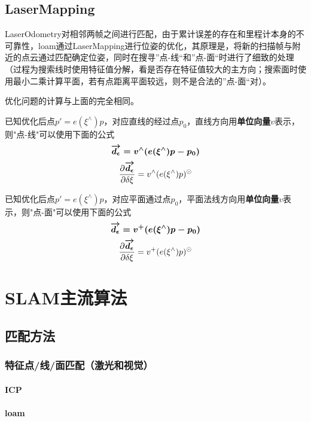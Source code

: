 \documentclass{ctexart}
\begin{document}
	\subsection{LaserMapping}
	LaserOdometry对相邻两帧之间进行匹配，由于累计误差的存在和里程计本身的不可靠性，loam通过LaserMapping进行位姿的优化，其原理是，将新的扫描帧与附近的点云通过匹配确定位姿，同时在搜寻”点-线“和”点-面“时进行了细致的处理（过程为搜索线时使用特征值分解，看是否存在特征值较大的主方向；搜索面时使用最小二乘计算平面，若有点距离平面较远，则不是合法的”点-面“对）。
	\par 优化问题的计算与上面的完全相同。
	\par 已知优化后点$p'=e(\xi ^\wedge)p$，对应直线的经过点$p_0$，直线方向用\textbf{单位向量}$v$表示，则"点-线"可以使用下面的公式
	\begin{equation}
	\boldmath\overrightarrow{d_{\epsilon}}\unboldmath = v^\wedge(e(\xi ^\wedge)p-p_0)
	\end{equation}
	\begin{equation}
	\frac{\partial \boldmath\overrightarrow{d_{\epsilon}}\unboldmath}{\partial\delta\xi}
	=
	v^\wedge(e(\xi^\wedge)p)^\odot
	\end{equation}
	\par 已知优化后点$p'=e(\xi ^\wedge)p$，对应平面通过点$p_0$，平面法线方向用\textbf{单位向量}$v$表示，则"点-面"可以使用下面的公式
	\begin{equation}
	\boldmath\overrightarrow{d_{\epsilon}}\unboldmath = v^{+}(e(\xi ^\wedge)p-p_0)
	\end{equation}
	\begin{equation}
	\frac{\partial \boldmath\overrightarrow{d_{\epsilon}}\unboldmath}{\partial\delta\xi}
	=
	v^{+}(e(\xi^\wedge)p)^\odot
	\end{equation}
	
	
	\section{SLAM主流算法}
	\subsection{匹配方法}
	\subsubsection{特征点/线/面匹配（激光和视觉）}
	\paragraph{ICP}
	\paragraph{loam}
\end{document}
